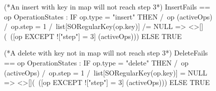 \documentclass{uit-thesis}
\begin{document}
\begin{figure}[h]
    \begin{tla}
(*An insert with key in map will not reach step 3*)
InsertFails ==
    \A op \in OperationStates :
        IF op.type = "insert"
        THEN
            /\ op \in (activeOps)
            /\ op.step = 1
            /\ list[SORegularKey(op.key)] /= NULL
         => <>[](~([op EXCEPT !["step"] = 3] \in (activeOps)))
        ELSE TRUE

(*A delete with key not in map will not reach step 3*)
DeleteFails ==
    \A op \in OperationStates :
            IF op.type = "delete"
            THEN
                /\ op \in (activeOps)
                /\ op.step = 1
                /\ list[SORegularKey(op.key)] = NULL
            => <>[](~([op EXCEPT !["step"] = 3] \in (activeOps)))
            ELSE TRUE


\end{tla}
\end{figure}
\end{document}
